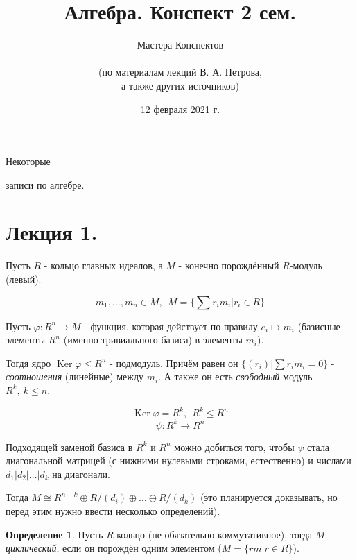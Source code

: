 \documentclass[a4paper,100pt]{article}
\title{Алгебра. Конспект 2 сем.}
\author{Мастера Конспектов\\ \\ (по материалам лекций В. А. Петрова,\\ а также других источников)}
\date{12 февраля 2021 г.}
\theoremstyle{indented}
\theoremstyle{definition}
\newtheorem{defn}{Определение}
\theoremstyle{remark}
\DeclareMathOperator{\Ker}{Ker}
\begin{document}
\newcommand{\resetexlcounters}{%
  \setcounter{exl}{0}%
} 

\newcommand{\resetremarkcounters}{%
  \setcounter{remark}{0}%
} 

\newcommand{\reseconscounters}{%
  \setcounter{cons}{0}%
} 

\newcommand{\resetall}{%
    \resetexlcounters
    \resetremarkcounters
    \reseconscounters%
}

\maketitle 

\newpage

\hypertarget{t1}{Некоторые} записи по алгебре.
\tableofcontents

\newpage


\section{Лекция 1.}

Пусть $R$ - кольцо главных идеалов, а $M$ - конечно порождённый $R$-модуль (левый). 

\[
    m_1, \ldots, m_n\in M, \:\:M=\{\sum r_im_i \vert r_i\in R\}
\]

Пусть $\varphi: R^n\rightarrow M$ - функция, которая действует по правилу $e_i\mapsto m_i$ (базисные элементы $R^n$ (именно тривиального базиса) в элементы $m_i$). \

Тогдя ядро $\Ker \varphi \leq R^n$ - подмодуль. Причём равен он $\{(r_i)\vert \sum r_im_i=0\}$ - \textit{соотношения} (линейные) между $m_i$. А также он есть \textit{свободный} модуль $R^k, \: k\leq n$. 

\[
    \Ker \varphi =R^k, \:\: R^k\leq R^n 
\]
\[
    \psi: R^k\rightarrow R^n
\]

Подходящей заменой базиса в $R^k$ и $R^n$ можно добиться того, чтобы $\psi$ стала диагональной матрицей (с нижними нулевыми строками, естественно) и числами $d_1\vert d_2\vert \ldots\vert d_k$ на диагонали.

Тогда $M\cong R^{n-k}\oplus R/(d_i)\oplus\ldots \oplus R/(d_k)$ (это планируется доказывать, но перед этим нужно ввести несколько определений).\ 

\begin{defn} 
    Пусть $R$ кольцо (не обязательно коммутативное), тогда $M$ - \textit{циклический}, если он порождён одним элементом ($M=\{rm\vert r\in R\}$).
\end{defn}
\end{document}
